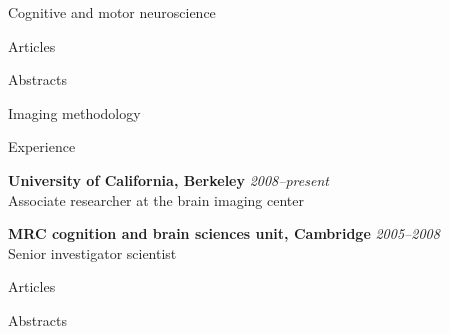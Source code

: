 \documentclass{cv}
\begin{document}
\begin{cvSection}{Cognitive and motor neuroscience}
\begin{cvSubSection}{Articles}

\printbibliography[heading=none,
    keyword=movethink,
    keyword=article,
notkeyword=omit]

\end{cvSubSection}

\begin{cvSubSection}{Abstracts}

\printbibliography[heading=none,
    keyword=movethink,
    keyword=abstract,
notkeyword=omit]

\end{cvSubSection}

\end{cvSection}

\begin{cvSection}{Imaging methodology}

\begin{cvSubSection}{Experience}

{\bf University of California, Berkeley} \hfill {\em 2008--present } \\
Associate researcher at the brain imaging center

{\bf MRC cognition and brain sciences unit, Cambridge} \hfill {\em 2005--2008}
\\
Senior investigator scientist

\end{cvSubSection}

\begin{cvSubSection}{Articles}

\printbibliography[heading=none,
    keyword=methods,
    keyword=article,
notkeyword=omit]

\end{cvSubSection}

\begin{cvSubSection}{Abstracts}

\printbibliography[heading=none,
    keyword=methods,
    keyword=abstract,
notkeyword=omit]

\end{cvSubSection}

\end{cvSection}
\end{document}
